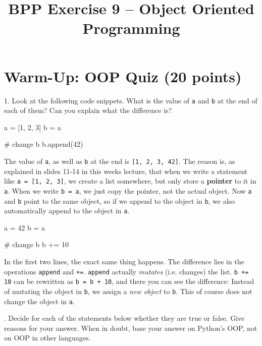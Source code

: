 

\title{BPP Exercise 9 -- Object Oriented Programming}





\section{Warm-Up: OOP Quiz (20 points)}

1. Look at the following code snippets. What is the value of {\tt a} and {\tt b} at the end of each of them? Can you explain what the difference is?

\begin{pythoncode}
a = [1, 2, 3]
b = a

# change b
b.append(42)
\end{pythoncode}

\begin{solution}
    The value of {\tt a}, as well as {\tt b} at the end is {\tt [1, 2, 3, 42]}. The reason is, as explained in slides 11-14 in this weeks lecture, that when we write a statement like {\tt a = [1, 2, 3]}, we create a list somewhere, but only store a {\bf pointer} to it in {\tt a}. When we write {\tt b = a}, we just copy the pointer, not the actual object. Now {\tt a} and {\tt b} point to the same object, so if we append to the object in {\tt b}, we also automatically append to the object in {\tt a}.
\end{solution}

\begin{pythoncode}
a = 42
b = a

# change b
b += 10
\end{pythoncode}

\begin{solution}
    In the first two lines, the exact same thing happens. The difference lies in the operations {\tt append} and {\tt +=}. {\tt append} actually {\it mutates} (i.e. changes) the list. {\tt b += 10} can be rewritten as {\tt b = b + 10}, and there you can see the difference: Instead of mutating the object in {\tt b}, we assign a {\it new object} to {\tt b}. This of course does not change the object in {\tt a}.

    \vspace{1em}
\end{solution}

. Decide for each of the statements below whether they are true or false. Give reasons for your answer. When in doubt, base your answer on Python's OOP, not on OOP in other languages.


